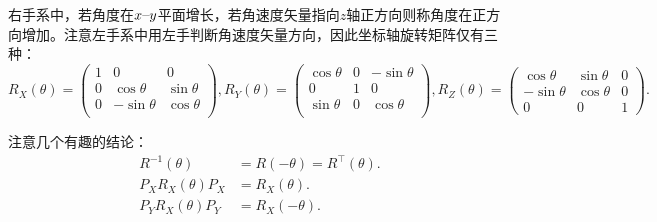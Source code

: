 \documentclass[11pt, a4paper, oneside]{ctexart}
\numberwithin{equation}{subsection}
\begin{document}
右手系中，若角度在$x\text{\textendash}y$平面增长，若角速度矢量指向$z$轴正方向则称角度在正方向增加。注意左手系中用左手判断角速度矢量方向，因此坐标轴旋转矩阵仅有三种：
\begin{equation}
R_{X}\left(\theta\right)=
\begin{pmatrix}
1 & 0 & 0\\
0 & \cos\theta & \sin\theta\\
0 & -\sin\theta & \cos\theta\\
\end{pmatrix},
R_{Y}\left(\theta\right)=
\begin{pmatrix}
\cos\theta & 0 & -\sin\theta\\
0 & 1 & 0\\
\sin\theta & 0 & \cos\theta\\
\end{pmatrix},
R_{Z}\left(\theta\right)=
\begin{pmatrix}
\cos\theta & \sin\theta & 0\\
-\sin\theta & \cos\theta & 0\\
0 & 0 & 1
\end{pmatrix}.
\end{equation}

注意几个有趣的结论：
\begin{align}
R^{-1}\left(\theta\right)&=R\left(-\theta\right)=R^\top\left(\theta\right).\\
P_XR_X\left(\theta\right)P_X&=R_X\left(\theta\right).\\
P_YR_X\left(\theta\right)P_Y&=R_X\left(-\theta\right).
\end{align}
\end{document}
